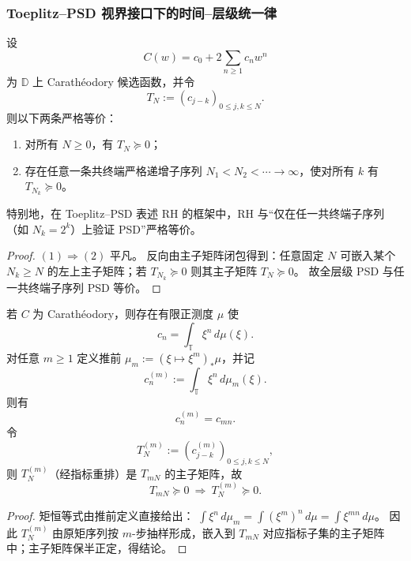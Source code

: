 \subsubsection{Toeplitz--PSD 视界接口下的时间--层级统一律}\label{subsubsec:xi-time-protocol-toeplitz-psd-interface}

\begin{theorem}\label{thm:xi-toeplitz-psd-cofinal-sparsification}
设
\[
C(w)=c_0+2\sum_{n\ge 1}c_n w^n
\]
为 \(\mathbb D\) 上 Carath\'eodory 候选函数，并令
\[
T_N:=(c_{j-k})_{0\le j,k\le N}.
\]
则以下两条严格等价：
\begin{enumerate}
  \item 对所有 \(N\ge 0\)，有 \(T_N\succeq 0\)；
  \item 存在任意一条共终端严格递增子序列 \(N_1<N_2<\cdots\to\infty\)，使对所有 \(k\) 有 \(T_{N_k}\succeq 0\)。
\end{enumerate}
特别地，在 Toeplitz--PSD 表述 RH 的框架中，RH 与“仅在任一共终端子序列（如 \(N_k=2^k\)）上验证 PSD”严格等价。
\end{theorem}

\begin{proof}
\((1)\Rightarrow(2)\) 平凡。
反向由主子矩阵闭包得到：任意固定 \(N\) 可嵌入某个 \(N_k\ge N\) 的左上主子矩阵；若 \(T_{N_k}\succeq 0\) 则其主子矩阵 \(T_N\succeq 0\)。
故全层级 PSD 与任一共终端子序列 PSD 等价。
\end{proof}



\begin{proposition}\label{prop:xi-adams-pushforward-toeplitz-principal-minor-monotonicity}
若 \(C\) 为 Carath\'eodory，则存在有限正测度 \(\mu\) 使
\[
c_n=\int_{\mathbb T}\xi^n\,d\mu(\xi).
\]
对任意 \(m\ge 1\) 定义推前 \(\mu_m:=(\xi\mapsto \xi^m)_\ast\mu\)，并记
\[
c_n^{(m)}:=\int_{\mathbb T}\xi^n\,d\mu_m(\xi).
\]
则有
\[
c_n^{(m)}=c_{mn}.
\]
令
\[
T_N^{(m)}:=(c^{(m)}_{j-k})_{0\le j,k\le N},
\]
则 \(T_N^{(m)}\)（经指标重排）是 \(T_{mN}\) 的主子矩阵，故
\[
T_{mN}\succeq 0\ \Longrightarrow\ T_N^{(m)}\succeq 0.
\]
\end{proposition}

\begin{proof}
矩恒等式由推前定义直接给出：
\(
\int \xi^n\,d\mu_m=\int (\xi^m)^n\,d\mu=\int \xi^{mn}\,d\mu
\)。
因此 \(T_N^{(m)}\) 由原矩序列按 \(m\)-步抽样形成，嵌入到 \(T_{mN}\) 对应指标子集的主子矩阵中；主子矩阵保半正定，得结论。
\end{proof}

